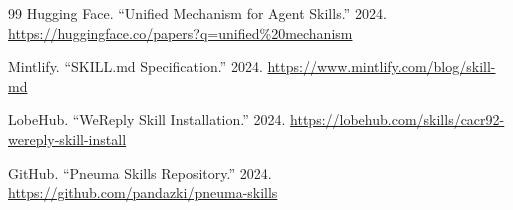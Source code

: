 \documentclass[11pt,a4paper]{article}
\begin{document}
\begin{thebibliography}{99}
Hugging Face. ``Unified Mechanism for Agent Skills.'' 2024. \url{https://huggingface.co/papers?q=unified%20mechanism}

Mintlify. ``SKILL.md Specification.'' 2024. \url{https://www.mintlify.com/blog/skill-md}


LobeHub. ``WeReply Skill Installation.'' 2024. \url{https://lobehub.com/skills/cacr92-wereply-skill-install}

GitHub. ``Pneuma Skills Repository.'' 2024. \url{https://github.com/pandazki/pneuma-skills}

\end{thebibliography}

\newpage
\end{document}
